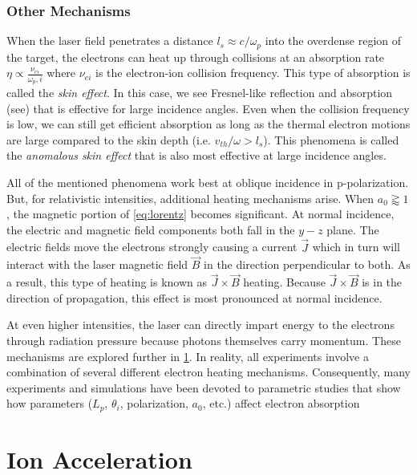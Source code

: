 \subsubsection{Other Mechanisms}
When the laser field penetrates a distance $l_s \approx c / \omega_p$ into the overdense region of the target, the electrons can heat up through collisions at an absorption rate $\eta \propto \frac{\nu_{ei}}{\omega_p,i}$\cite{Gibbon_2005_Plasma} where $\nu_{ei}$ is the electron-ion collision frequency. This type of absorption is called the \emph{skin effect}. In this case, we see Fresnel-like reflection and absorption (see\cite{Griffiths_2017}) that is effective for large incidence angles. Even when the collision frequency is low, we can still get efficient absorption as long as the thermal electron motions are large compared to the skin depth (i.e. $v_{th}/\omega > l_s$)\cite{Gibbon_2005_Plasma}. This phenomena is called the \emph{anomalous skin effect} that is also most effective at large incidence angles. 

All of the mentioned phenomena work best at oblique incidence in p-polarization. But, for relativistic intensities, additional heating mechanisms arise. When $a_0 \gtrapprox 1$, the magnetic portion of \cref{eq:lorentz} becomes significant. At normal incidence, the electric and magnetic field components both fall in the $y-z$ plane. The electric fields move the electrons strongly causing a current $\vec{J}$ which in turn will interact with the laser magnetic field $\vec{B}$ in the direction perpendicular to both. As a result, this type of heating is known as $\vec{J} \times \vec{B}$ heating\cite{Gibbon_2005_Plasma,Kruer_1985_PoF}. Because $\vec{J} \times \vec{B}$ is in the direction of propagation, this effect is most pronounced at normal incidence.

At even higher intensities, the laser can directly impart energy to the electrons through radiation pressure\cite{Macchi_2013_RevModPhys} because photons themselves carry momentum. These mechanisms are explored further in \cref{sec:acceleration}. In reality, all experiments involve a combination of several different electron heating mechanisms. Consequently, many experiments and simulations have been devoted to parametric studies that show how parameters ($L_p$, $\theta_i$, polarization, $a_0$, etc.) affect electron absorption

\section{Ion Acceleration} \label{sec:acceleration}

